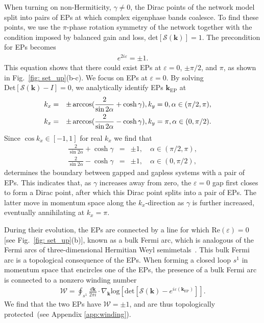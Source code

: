 \documentclass[aps,pra,reprint,superscriptaddress,showkeys,amsmath,amssymb,longbibliography]{revtex4-1}
\begin{document}
When turning on non-Hermiticity, $\gamma\neq0$, the Dirac points of the network model split into pairs of EPs at which complex eigenphase bands coalesce.
To find these points, we use the $\pi$-phase rotation symmetry of the network together with the condition imposed by balanced gain and loss, $\text{det}[\mathcal{S}(\textbf{k})]=1$.
The precondition for EPs becomes 
\begin{eqnarray}
e^{2i\varepsilon}=\pm 1.
\end{eqnarray}
This equation shows that there could exist EPs at $\varepsilon=0$, $\pm\pi/2$, and $\pi$, as shown in Fig.~\ref{fig: set_up}(b-c). 
We focus on EPs at $\varepsilon=0$. 
By solving $\text{Det}[\mathcal{S}(\textbf{k})-I]=0$, we analytically identify EPs $\textbf{k}_{\text{EP}}$  at
\begin{eqnarray}\label{eq:eps}
\hspace{-5mm}k_x&=&\pm\arccos(\frac{2}{\sin 2\alpha}+\cosh\gamma), k_y=0, \alpha\in (\pi/2,\pi),\\
\hspace{-5mm}k_x&=&\pm\arccos(\frac{2}{\sin 2\alpha}-\cosh\gamma), k_y=\pi, \alpha\in (0,\pi/2). 
\end{eqnarray}
Since $\cos k_x \in [-1, 1]$ for real $k_x$  we find that
\begin{eqnarray}
\frac{2}{\sin 2\alpha}+\cosh\gamma&=&\pm 1,\quad \alpha\in (\pi/2,\pi),\label{eq:boundary_1}\\
\frac{2}{\sin 2\alpha}-\cosh\gamma&=&\pm 1,\quad \alpha\in (0,\pi/2), \label{eq:boundary_2}
\end{eqnarray}
determines the boundary between gapped and gapless systems with a pair of EPs.
This indicates that, as $\gamma$ increases away from zero, the $\varepsilon=0$ gap first closes to form a Dirac point, after which this Dirac point splits into a pair of EPs.
The latter move in momentum space along the $k_x$-direction as $\gamma$ is further increased, eventually annihilating at $k_x=\pi$.

During their evolution, the EPs are connected by a line for which $\text{Re}(\varepsilon)=0$ [see Fig.~\ref{fig: set_up}(b)], known as a bulk Fermi arc, which is analogous of the Fermi arcs of three-dimensional Hermitian Weyl semimetals~\cite{rmp_weyl, Wan_weyl, Binghai_weyl, Burkov_weyl}.
This bulk Fermi arc is a topological consequence of the EPs.
When forming a closed loop $s^1$ in momentum space that encircles one of the EPs, the presence of a bulk Fermi arc is connected to a nonzero winding number~\cite{Kawabata2019}
\begin{eqnarray}
\mathcal{W}=\oint_{s^1}\frac{d\textbf{k}}{2\pi i}\cdot \nabla_{\textbf{k}}\text{log}[\text{det}[\mathcal{S}(\textbf{k})-e^{i\varepsilon(\textbf{k}_{\text{EP}})}]].\label{eq: winding}
\end{eqnarray}
We find that the two EPs have $\mathcal{W}=\pm 1$, and are thus topologically protected~(see Appendix \ref{app:winding}).
\end{document}
